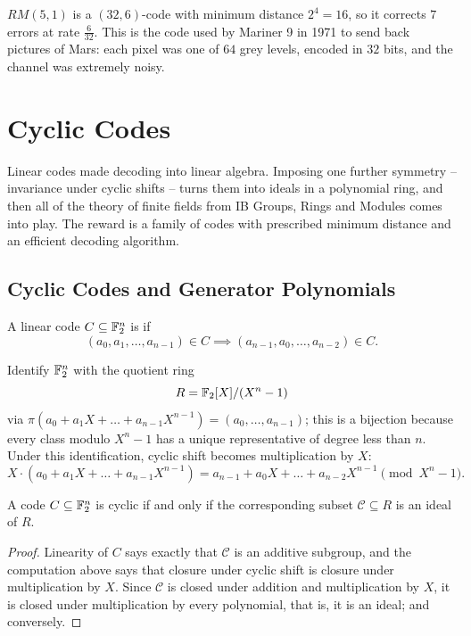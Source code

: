 \documentclass[a4paper]{scrartcl}
\newcommand{\Cc}{\mathcal{C}}
\begin{document}
\begin{example}
	$RM(5,1)$ is a $(32,6)$-code with minimum distance $2^4 = 16$, so it corrects $7$ errors at rate $\frac6{32}$. This is the code used by Mariner 9 in 1971 to send back pictures of Mars: each pixel was one of $64$ grey levels, encoded in $32$ bits, and the channel was extremely noisy.
\end{example}


\section{Cyclic Codes}\label{sec:cyclic}

Linear codes made decoding into linear algebra. Imposing one further symmetry -- invariance under cyclic shifts -- turns them into ideals in a polynomial ring, and then all of the theory of finite fields from IB Groups, Rings and Modules comes into play. The reward is a family of codes with prescribed minimum distance and an efficient decoding algorithm.

\subsection{Cyclic Codes and Generator Polynomials}

\begin{definition}
	A linear code $C \subseteq \mathbb{F}_2^n$ is  if
	$$(a_0,a_1,\dots,a_{n-1}) \in C \implies (a_{n-1},a_0,\dots,a_{n-2}) \in C.$$
\end{definition}

Identify $\mathbb{F}_2^n$ with the quotient ring
$$R = \mathbb{F}_2[X]/(X^n-1)$$
via $\pi(a_0+a_1X+\dots+a_{n-1}X^{n-1}) = (a_0,\dots,a_{n-1})$; this is a bijection because every class modulo $X^n - 1$ has a unique representative of degree less than $n$. Under this identification, cyclic shift becomes multiplication by $X$:
$$X\cdot(a_0+a_1X+\dots+a_{n-1}X^{n-1}) = a_{n-1}+a_0X+\dots+a_{n-2}X^{n-1} \pmod{X^n-1}.$$

\begin{lemma}
	A code $C \subseteq \mathbb{F}_2^n$ is cyclic if and only if the corresponding subset $\Cc \subseteq R$ is an ideal of $R$.
\end{lemma}

\begin{proof}
	Linearity of $C$ says exactly that $\Cc$ is an additive subgroup, and the computation above says that closure under cyclic shift is closure under multiplication by $X$. Since $\Cc$ is closed under addition and multiplication by $X$, it is closed under multiplication by every polynomial, that is, it is an ideal; and conversely.
\end{proof}
\end{document}
